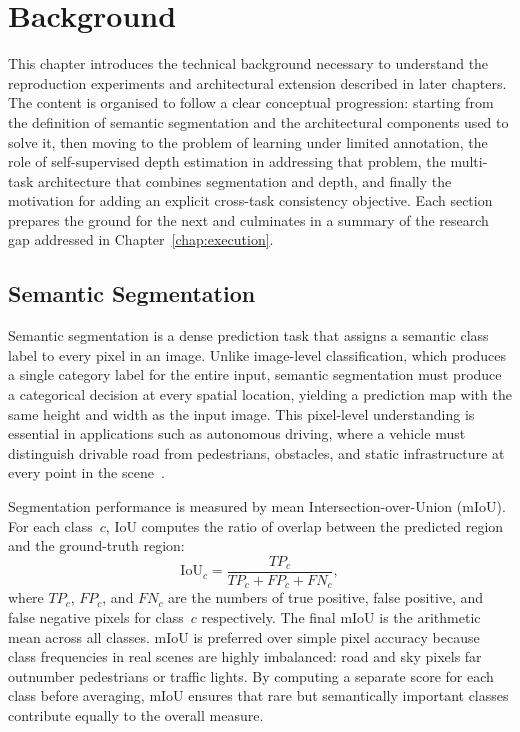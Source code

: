 \chapter{Background}
\label{chap:technical}

This chapter introduces the technical background necessary to understand
the reproduction experiments and architectural extension described in later
chapters. The content is organised to follow a clear conceptual progression:
starting from the definition of semantic segmentation and the architectural
components used to solve it, then moving to the problem of learning under
limited annotation, the role of self-supervised depth estimation in
addressing that problem, the multi-task architecture that combines
segmentation and depth, and finally the motivation for adding an explicit
cross-task consistency objective. Each section prepares the ground for the next and culminates in a
summary of the research gap addressed in Chapter~\ref{chap:execution}.

\section{Semantic Segmentation}
\label{sec:semseg}

Semantic segmentation is a dense prediction task that assigns a semantic
class label to every pixel in an image. Unlike image-level classification,
which produces a single category label for the entire input, semantic
segmentation must produce a categorical decision at every spatial location,
yielding a prediction map with the same height and width as the input
image. This pixel-level understanding is essential in applications such as
autonomous driving, where a vehicle must distinguish drivable road from
pedestrians, obstacles, and static infrastructure at every point in the
scene~\cite{cordts2016cityscapes}.

Segmentation performance is measured by mean Intersection-over-Union
(mIoU). For each class~$c$, IoU computes the ratio of overlap between the
predicted region and the ground-truth region:
\[
    \mathrm{IoU}_c = \frac{TP_c}{TP_c + FP_c + FN_c},
\]
where $TP_c$, $FP_c$, and $FN_c$ are the numbers of true positive, false
positive, and false negative pixels for class~$c$ respectively. The final
mIoU is the arithmetic mean across all classes. mIoU is preferred over
simple pixel accuracy because class frequencies in real scenes are highly
imbalanced: road and sky pixels far outnumber pedestrians or traffic
lights. By computing a separate score for each class before averaging,
mIoU ensures that rare but semantically important classes contribute
equally to the overall measure.

